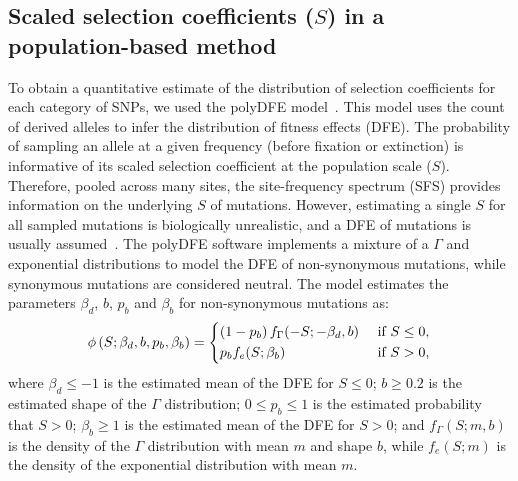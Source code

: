\documentclass[12pt]{article}
\newcommand{\Spop}{S}
\newcommand{\AdvMean}{\beta_b}
\newcommand{\DelMean}{\beta_d}
\begin{document}
    \subsection{Scaled selection coefficients ($\Spop$) in a population-based method}
    \label{subsec:s-polymorphism-method}
    To obtain a quantitative estimate of the distribution of selection coefficients for each category of SNPs, we used the polyDFE model~\cite{tataru_inference_2017, tataru_polydfe_2020}.
    This model uses the count of derived alleles to infer the distribution of fitness effects (DFE).
    The probability of sampling an allele at a given frequency (before fixation or extinction) is informative of its scaled selection coefficient at the population scale ($\Spop$).
    Therefore, pooled across many sites, the site-frequency spectrum (SFS) provides information on the underlying $\Spop$ of mutations.
    However, estimating a single $\Spop$ for all sampled mutations is biologically unrealistic, and a DFE of mutations is usually assumed~\cite{eyre-walker_distribution_2006, eyre-walker_estimating_2009}.
    The polyDFE\cite{tataru_inference_2017, tataru_polydfe_2020} software implements a mixture of a $\Gamma$ and exponential distributions to model the DFE of non-synonymous mutations, while synonymous mutations are considered neutral.
    The model estimates the parameters $\DelMean$, $b$, $p_b$ and $\AdvMean$ for non-synonymous mutations as:
    \begin{equation}
        \phi \left( \Spop; \DelMean , b, p_b, \AdvMean \right) =
        \begin{dcases}
            \left( 1 - p_b \right) f_{\Gamma}(-\Spop; -\DelMean, b) & \text{ if $\Spop \leq 0$,} \\
            p_b f_{e}(\Spop; \AdvMean) & \text{ if $\Spop > 0$,} \\
        \end{dcases}
    \end{equation}
    where $\DelMean \leq -1 $ is the estimated mean of the DFE for $\Spop \leq 0$;
    $b \geq 0.2$ is the estimated shape of the $\Gamma$ distribution;
    $0 \leq p_b \leq 1$ is the estimated probability that $\Spop > 0$;
    $\AdvMean \geq 1$ is the estimated mean of the DFE for $\Spop > 0$;
    and $f_{\Gamma}(\Spop; m, b)$ is the density of the $\Gamma$ distribution with mean $m$ and shape $b$, while $f_{e}(\Spop; m)$ is the density of the exponential distribution with mean $m$.
\end{document}

